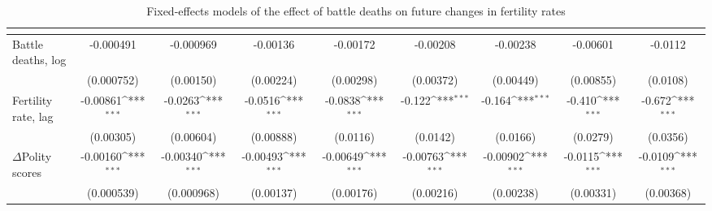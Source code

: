 \begin{table}[htbp]\centering
\def\sym#1{\ifmmode^{#1}\else\(^{#1}\)\fi}
\caption{Fixed-effects models of the effect of battle deaths on future changes in fertility rates \label{fertilitybdeath}}
\begin{tabular}{l*{8}{c}}
\hline\hline
                    &&&&&&&&\\
\hline
Battle deaths, log           &   -0.000491         &   -0.000969         &    -0.00136         &    -0.00172         &    -0.00208         &    -0.00238         &    -0.00601         &     -0.0112         \\
                    &  (0.000752)         &   (0.00150)         &   (0.00224)         &   (0.00298)         &   (0.00372)         &   (0.00449)         &   (0.00855)         &    (0.0108)         \\
[1em]
Fertility rate, lag      &    -0.00861\sym{***}&     -0.0263\sym{***}&     -0.0516\sym{***}&     -0.0838\sym{***}&      -0.122\sym{***}&      -0.164\sym{***}&      -0.410\sym{***}&      -0.672\sym{***}\\
                    &   (0.00305)         &   (0.00604)         &   (0.00888)         &    (0.0116)         &    (0.0142)         &    (0.0166)         &    (0.0279)         &    (0.0356)         \\
[1em]
$\Delta$Polity scores            &    -0.00160\sym{***}&    -0.00340\sym{***}&    -0.00493\sym{***}&    -0.00649\sym{***}&    -0.00763\sym{***}&    -0.00902\sym{***}&     -0.0115\sym{***}&     -0.0109\sym{***}\\
                    &  (0.000539)         &  (0.000968)         &   (0.00137)         &   (0.00176)         &   (0.00216)         &   (0.00238)         &   (0.00331)         &   (0.00368)         \\

\end{tabular}
\end{table}
